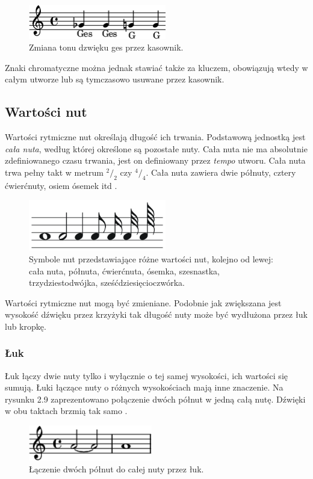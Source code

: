 \documentclass[printmode, eng, openany]{mgr}
\newcommand\tab[1][1cm]{\hspace*{#1}}
\newcommand*\rfrac[2]{{}^{#1}\!/_{#2}}
\begin{document}
\begin{figure}[!htb]
\centering
\includegraphics[width=6cm]{kasownik_poj}
\caption{Zmiana tonu dzwięku ges przez kasownik.}
\end{figure}

\tab Znaki chromatyczne można jednak stawiać także za kluczem, obowiązują wtedy w całym utworze lub są tymczasowo usuwane przez kasownik.

\subsection{Wartości nut}
\tab Wartości rytmiczne nut określają długość ich trwania. Podstawową jednostką jest \textit{cała nuta}, według której określone są pozostałe nuty. Cała nuta nie ma absolutnie zdefiniowanego czasu trwania, jest on definiowany przez \textit{tempo} utworu. Cała nuta trwa pełny takt w metrum $\rfrac{2}{2}$ czy $\rfrac{4}{4}$. Cała nuta zawiera dwie półnuty, cztery ćwierćnuty, osiem ósemek itd \cite{wart}. 

\begin{figure}[H]
\centering
\includegraphics[width=6cm]{wartosci_nut}
\caption{Symbole nut przedstawiające różne wartości nut, kolejno od lewej: cała nuta, półnuta, ćwierćnuta, ósemka, szesnastka, trzydziestodwójka, sześćdziesięcioczwórka.}
\end{figure}
\tab Wartości rytmiczne nut mogą być zmieniane. Podobnie jak zwiększana jest wysokość dźwięku przez krzyżyki tak długość nuty może być wydłużona przez łuk lub kropkę. 
\subsubsection{Łuk}
\tab Łuk łączy dwie nuty tylko i wyłącznie o tej samej wysokości, ich wartości się sumują. Łuki łączące nuty o różnych wysokościach mają inne znaczenie. Na rysunku 2.9 zaprezentowano połączenie dwóch półnut w jedną całą nutę. Dźwięki w obu taktach brzmią tak samo \cite{wart}.

\begin{figure}[!htb]
\centering
\includegraphics[width=5.4cm]{luk}
\caption{Łączenie dwóch półnut do całej nuty przez łuk.}
\end{figure}
\end{document}
